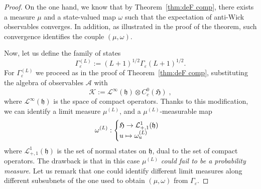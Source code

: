 \documentclass[AHL,Unicode,longabstracts,published]{cedram}
\newcommand{\cA}{\mathcal{A}}
\newcommand{\cL}{\mathcal{L}}
\newcommand{\cK}{\mathcal{K}}
\newcommand{\gH}{\mathfrak{H}}
\newcommand{\gh}{\mathfrak{h}}
\newcommand{\1}{\mathds{1}}
\renewcommand*{\to}{\mathchoice{\longrightarrow}{\rightarrow}{\rightarrow}{\rightarrow}}
\let\oldmapsto\mapsto
\renewcommand*{\mapsto}{\mathchoice{\longmapsto}{\oldmapsto}{\oldmapsto}{\oldmapsto}}
\begin{document}
\begin{proof}
On the one hand, we know that by Theorem~\ref{thm:deF comp}, there exists a measure $\mu$ and a state-valued map $\omega$ such that the expectation of anti-Wick observables converges. In addition, as illustrated in the proof of the theorem, such convergence identifies the couple $(\mu,\omega)$.

Now, let us define the family of states
\begin{equation*}
\Gamma_{\varepsilon}^{(L)}:=(L+1)^{1/2}\Gamma_{\varepsilon}(L+1)^{1/2}.
\end{equation*}
For $\Gamma_{\varepsilon}^{(L)}$ we proceed as in the proof of Theorem~\ref{thm:deF comp}, substituting the algebra of observables $\cA$ with
\begin{equation*}
\cK:= \cL^{\infty}(\gh)\otimes C_c^0( \gH)\;,
\end{equation*}
where $\cL^{\infty}(\gh)$ is the space of compact operators. Thanks to this modification, we can identify a limit measure $\mu^{(L)}$, and a $\mu^{(L)}$-measurable map
\begin{equation*}
\omega^{(L)} :
\begin{cases}
\gH \to \cL^1_{+,1} (\gh)\\
u \mapsto \omega^{(L)}_u
\end{cases}
\end{equation*}
where $\cL^1_{+,1} (\gh)$ is the set of normal states on $\gh$, dual to the set of compact operators. The drawback is that in this case $\mu^{(L)}$ \emph{could fail to be a probability measure}. Let us remark that one could identify different limit measures along different subsubnets of the one used to obtain $(\mu,\omega)$ from $\Gamma_{\varepsilon}$.


\end{proof}
\end{document}
